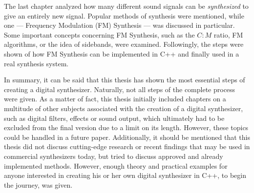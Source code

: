 The last chapter analyzed how many different sound signals can be \emph{synthesized} to give an entirely new signal. Popular methods of synthesis were mentioned, while one --- Frequency Modulation (FM) Synthesis --- was discussed in particular. Some important concepts concerning FM Synthesis, such as the $C:M$ ratio, FM algorithms, or the idea of sidebands, were examined. Followingly, the steps were shown of how FM Synthesis can be implemented in C++ and finally used in a real synthesis system. \parbreak

\pagebreak

In summary, it can be said that this thesis has shown the most essential steps of creating a digital synthesizer. Naturally, not all steps of the complete process were given. As a matter of fact, this thesis initially included chapters on a multitude of other subjects associated with the creation of a digital synthesizer, such as digital filters, effects or sound output, which ultimately had to be excluded from the final version due to a limit on its length. However, these topics could be handled in a future paper. Additionally, it should be mentioned that this thesis did not discuss cutting-edge research or recent findings that may be used in commercial synthesizers today, but tried to discuss approved and already implemented methods. However, enough theory and practical examples for anyone interested in creating his or her own digital synthesizer in C++, to begin the journey, was given.
